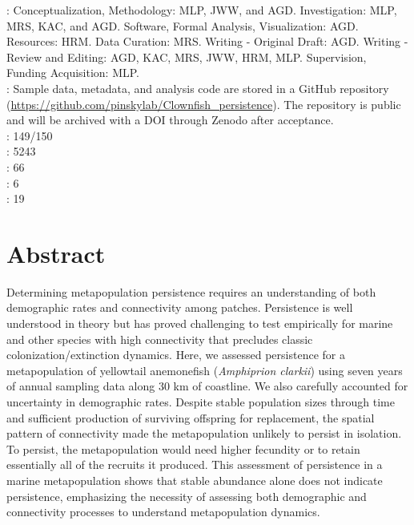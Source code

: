 \documentclass[12pt, oneside]{article}   	%
\begin{document}
\begin{singlespace*}
: Conceptualization, Methodology: MLP, JWW, and AGD. Investigation: MLP, MRS, KAC, and AGD. Software, Formal Analysis, Visualization: AGD. Resources: HRM. Data Curation: MRS. Writing - Original Draft: AGD. Writing - Review and Editing: AGD, KAC, MRS, JWW, HRM, MLP. Supervision, Funding Acquisition: MLP.  \\

: Sample data, metadata, and analysis code are stored in a GitHub repository (\url{https://github.com/pinskylab/Clownfish_persistence}). The repository is public and will be archived with a DOI through Zenodo after acceptance. \\

: 149/150 \\ 

: 5243 \\ 

: 66 \\ 

: 6 \\ 

: 19 \\ 

\end{singlespace*}

\newpage{}
\linenumbers{}
\modulolinenumbers[3]

\section*{Abstract}
Determining metapopulation persistence requires an understanding of both demographic rates and connectivity among patches. Persistence is well understood in theory but has proved challenging to test empirically for marine and other species with high connectivity that precludes classic colonization/extinction dynamics. Here, we assessed persistence for a metapopulation of yellowtail anemonefish (\textit{Amphiprion clarkii}) using seven years of annual sampling data along 30 km of coastline. We also carefully accounted for uncertainty in demographic rates. Despite stable population sizes through time and sufficient production of surviving offspring for replacement, the spatial pattern of connectivity made the metapopulation unlikely to persist in isolation. To persist, the metapopulation would need higher fecundity or to retain essentially all of the recruits it produced. This assessment of persistence in a marine metapopulation shows that stable abundance alone does not indicate persistence, emphasizing the necessity of assessing both demographic and connectivity processes to understand metapopulation dynamics. 
\end{document}
